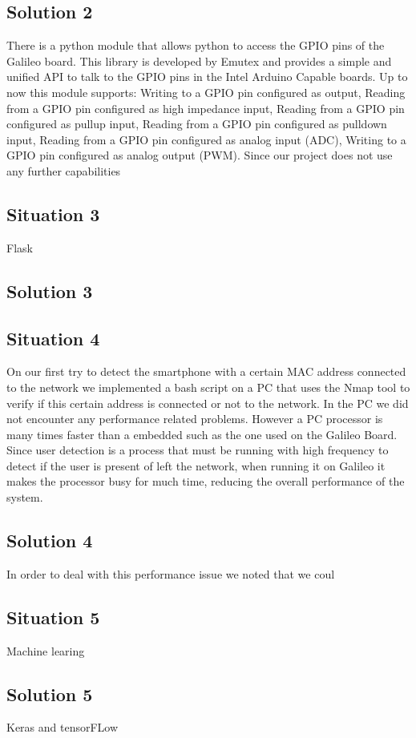 \documentclass[12pt]{partialreport}
\begin{document}
\subsection*{Solution 2}
There is a python module that allows python to access the GPIO pins of the Galileo board. This library is developed by Emutex and provides a simple and unified API to talk to the GPIO pins in the Intel Arduino Capable boards. Up to now this module supports: Writing to a GPIO pin configured as output, Reading from a GPIO pin configured as high impedance input, Reading from a GPIO pin configured as pullup input, Reading from a GPIO pin configured as pulldown input, Reading from a GPIO pin configured as analog input (ADC), Writing to a GPIO pin configured as analog output (PWM). Since our project does not use any further capabilities 

\subsection*{Situation 3}
Flask
\subsection*{Solution 3}


\subsection*{Situation 4}
On our first try to detect the smartphone with a certain MAC address connected to the network we implemented a bash script on a PC that uses the Nmap tool to verify if this certain address is connected or not to the network. In the PC we did not encounter any performance related problems. However a PC processor is many times faster than a embedded such as the one used on the Galileo Board. Since user detection is a process that must be running with high frequency to detect if the user is present of left the network, when running it on Galileo it makes the processor busy for much time, reducing the overall performance of the system.

\subsection*{Solution 4}
In order to deal with this performance issue we noted that we coul


\subsection*{Situation 5}
Machine learing

\subsection*{Solution 5}
Keras and tensorFLow
\end{document}
